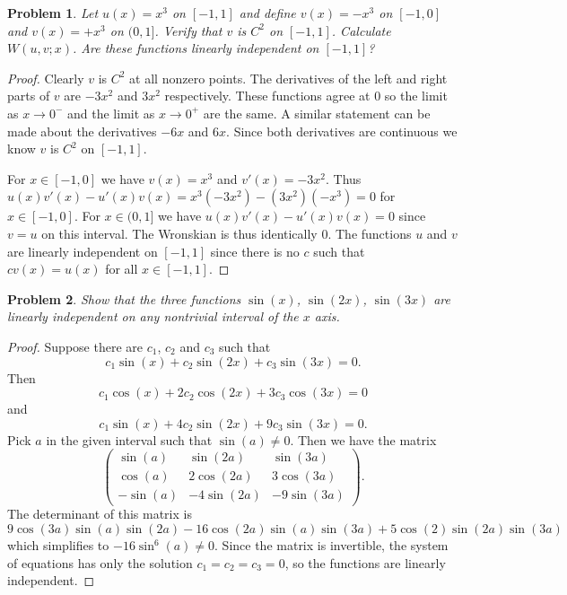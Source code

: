 \documentclass{article}
\newtheorem{problem}{Problem}
\begin{document}
\begin{problem}
Let $u(x) = x^3$ on $[-1,1]$ and define $v(x) = -x^3$ on $[-1,0]$ and $v(x) = +x^3$ on $(0,1]$. Verify that $v$ is $C^2$ on $[-1,1]$. Calculate $W(u,v;x)$. Are these functions linearly independent on $[-1,1]$?
\end{problem}
\begin{proof}
Clearly $v$ is $C^2$ at all nonzero points. The derivatives of the left and right parts of $v$ are $-3x^2$ and $3x^2$ respectively. These functions agree at $0$ so the limit as $x \rightarrow 0^-$ and the limit as $x \rightarrow 0^+$ are the same. A similar statement can be made about the derivatives $-6x$ and $6x$. Since both derivatives are continuous we know $v$ is $C^2$ on $[-1, 1]$.

For $x \in [-1,0]$ we have $v(x) = x^3$ and $v'(x) = -3x^2$. Thus $u(x)v'(x) - u'(x)v(x) = x^3(-3x^2) - (3x^2)(-x^3) = 0$ for $x \in [-1,0]$. For $x \in (0,1]$ we have $u(x)v'(x) - u'(x)v(x) = 0$ since $v = u$ on this interval. The Wronskian is thus identically $0$. The functions $u$ and $v$ are linearly independent on $[-1,1]$ since there is no $c$ such that $cv(x) = u(x)$ for all $x \in [-1,1]$.
\end{proof}

\begin{problem}
Show that the three functions $\sin(x)$, $\sin(2x)$, $\sin(3x)$ are linearly independent on any nontrivial interval of the $x$ axis.
\end{problem}
\begin{proof}
Suppose there are $c_1$, $c_2$ and $c_3$ such that
\[
c_1 \sin(x) + c_2 \sin(2x) + c_3 \sin(3x) = 0.
\]
Then
\[
c_1 \cos(x) + 2c_2 \cos(2x) + 3c_3 \cos(3x) = 0
\]
and
\[
c_1 \sin(x) + 4c_2 \sin(2x) + 9c_3 \sin(3x) = 0.
\]
Pick $a$ in the given interval such that $\sin(a) \neq 0$. Then we have the matrix
\[
\left (
\begin{array}{ccc}
\sin(a) & \sin(2a) & \sin(3a)\\
\cos(a) & 2\cos(2a) & 3\cos(3a)\\
-\sin(a) & -4\sin(2a) & -9\sin(3a)
\end{array}
\right ).
\]
The determinant of this matrix is
\[
9 \cos(3a) \sin(a) \sin(2a) - 16 \cos(2a) \sin(a) \sin (3a) + 5 \cos(2) \sin(2a) \sin(3a)
\]
which simplifies to $-16 \sin^6(a) \neq 0$. Since the matrix is invertible, the system of equations has only the solution $c_1 = c_2 = c_3 = 0$, so the functions are linearly independent.
\end{proof}
\end{document}
